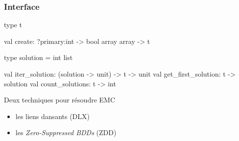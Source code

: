 \documentclass{beamer}
\begin{document}










\begin{frame}[fragile]\frametitle{Interface}
  \begin{ocaml}
  type t

  val create: ?primary:int -> bool array array -> t

  type solution = int list

  val iter_solution: (solution -> unit) -> t -> unit
  val get_first_solution: t -> solution
  val count_solutions: t -> int
  \end{ocaml}
\end{frame}


\begin{frame}{Deux techniques pour résoudre EMC}

  \begin{itemize}
  \item les liens dansants (DLX)
  \item les \textit{Zero-Suppressed BDDs} (ZDD)
  \end{itemize}

\end{frame}
\end{document}
